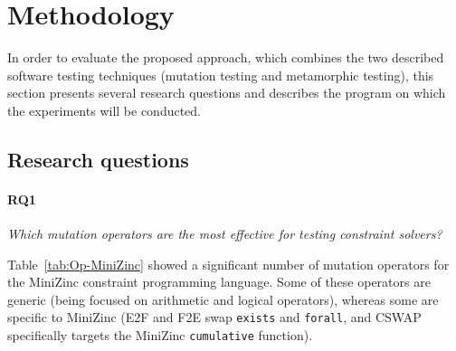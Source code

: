 \section{Methodology}
\label{sec:method}
In order to evaluate the proposed approach, which combines the two described
software testing techniques (mutation testing and metamorphic
testing),
this section presents several research questions and
describes the program on which the experiments will be conducted.










\subsection{Research questions}

\newcommand{\rqoperators}{RQ1}
\newcommand{\rqmetamorphic}{RQ2}
\newcommand{\rqidentifying}{RQ3}

\paragraph{\rqoperators} \emph{Which mutation operators are the most effective for testing constraint solvers?}

Table~\ref{tab:Op-MiniZinc} showed a significant number of mutation operators for the MiniZinc constraint programming language. Some of these operators are generic (being focused on arithmetic and logical operators), whereas some are specific to MiniZinc (E2F and F2E swap \texttt{exists} and \texttt{forall}, and CSWAP specifically targets the MiniZinc \texttt{cumulative} function).

